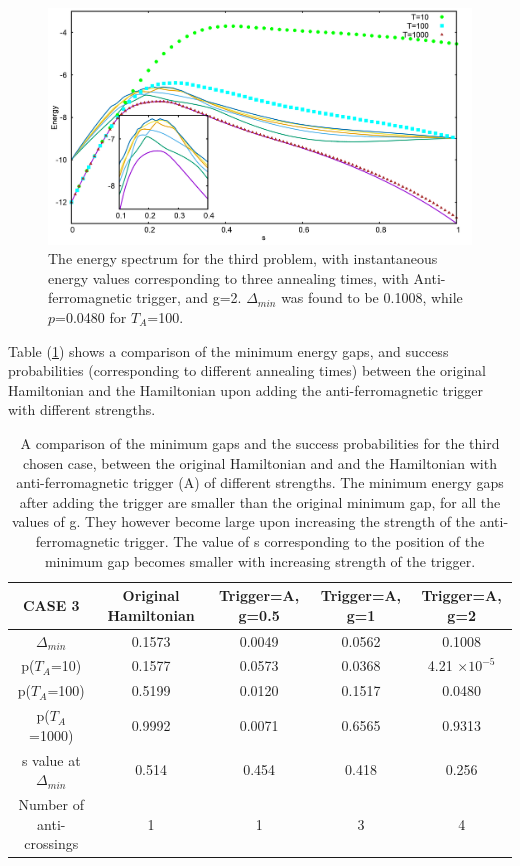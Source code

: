 \documentclass[12]{article}
\begin{document}
\begin{figure}[H]
\centering 
\includegraphics[scale=0.3]{528_s12_A_g2.png}
\caption{The energy spectrum for the third problem, with instantaneous energy values corresponding to three annealing times, with Anti-ferromagnetic trigger, and g=2. $\Delta_{min}$ was found to be 0.1008, while $p$=0.0480 for $T_A$=100. }
\label{fig:a9}
\end{figure}

Table (\ref{tab:a3}) shows a comparison of the minimum energy gaps, and success probabilities (corresponding to different annealing times) between the original Hamiltonian and the Hamiltonian upon adding the anti-ferromagnetic trigger with different strengths. 

\begin{table}[H]
\centering
\renewcommand{\arraystretch}{1.5}
\begin{tabular}{|c|c|c|c|c|}
\hline 
CASE 3 & Original Hamiltonian & Trigger=A, g=0.5 & Trigger=A, g=1 & Trigger=A, g=2 \\ 
\hline 
$\Delta_{min}$ & 0.1573 & 0.0049 & 0.0562 & 0.1008 \\ 
\hline 
p($T_A$=10) & 0.1577 & 0.0573 & 0.0368 & 4.21 $\times 10^{-5}$\\ 
\hline 
p($T_A$=100) & 0.5199 & 0.0120 & 0.1517 & 0.0480 \\ 
\hline 
p($T_A$=1000) & 0.9992 & 0.0071 & 0.6565 & 0.9313 \\ 
\hline 
s value at $\Delta_{min}$ & 0.514 & 0.454 & 0.418 & 0.256 \\ 
\hline 
Number of anti-crossings & 1 & 1 & 3 & 4 \\
\hline
\end{tabular} 
\caption{A comparison of the minimum gaps and the success probabilities for the third chosen case, between the original Hamiltonian and and the Hamiltonian with anti-ferromagnetic trigger (A) of different strengths. The minimum energy gaps after adding the trigger are smaller than the original minimum gap, for all the values of g. They however become large upon increasing the strength of the anti-ferromagnetic trigger. The value of s corresponding to the position of the minimum gap becomes smaller with increasing strength of the trigger.}
\label{tab:a3}
\end{table}
\end{document}
